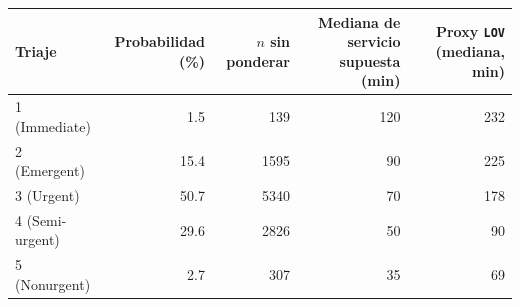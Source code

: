 \begin{tabular}{lrrrr}
\toprule
Triaje & Probabilidad (\%) & $n$ sin ponderar & Mediana de servicio supuesta (min) & Proxy \texttt{LOV} (mediana, min) \\
\midrule
1 (Immediate) & 1.5 & 139 & 120 & 232 \\
2 (Emergent) & 15.4 & 1595 & 90 & 225 \\
3 (Urgent) & 50.7 & 5340 & 70 & 178 \\
4 (Semi-urgent) & 29.6 & 2826 & 50 & 90 \\
5 (Nonurgent) & 2.7 & 307 & 35 & 69 \\
\bottomrule
\end{tabular}
